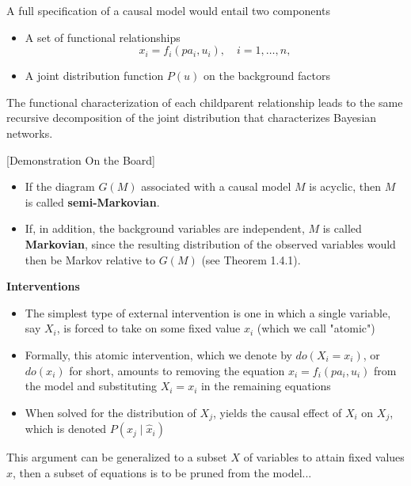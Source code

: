 \documentclass{beamer}
\begin{document}
\begin{frame}
A full specification of a causal model would entail two components
\begin{itemize}
\item A set of functional relationships
$$
x_i=f_i\left(p a_i, u_i\right), \quad i=1, \ldots, n,
$$
\item A joint distribution function $P(u)$ on the background factors
\end{itemize}

The functional characterization of each childparent relationship leads to the same recursive decomposition of the joint distribution that characterizes Bayesian networks.
\begin{center}
[Demonstration On the Board]
\end{center}

\vspace{0.2cm}
\begin{itemize}
\item If the diagram $G(M)$ associated with a causal model $M$ is acyclic, then $M$ is called \textbf{semi-Markovian}.
\item If, in addition, the background variables are independent, $M$ is called \textbf{Markovian}, since the resulting distribution of the observed variables would then be Markov relative to $G(M)$ (see Theorem 1.4.1).
\end{itemize}
\end{frame}

\begin{frame}
\textbf{Interventions}
\vspace{0.2cm}
\begin{itemize}
\item The simplest type of external intervention is one in which a single variable, say $X_i$, is forced to take on some fixed value $x_i$ (which we call "atomic")
\item Formally, this atomic intervention, which we denote by $do\left(X_i=x_i\right)$, or $do\left(x_i\right)$ for short, amounts to removing the equation $x_i=f_i\left(p a_i, u_i\right)$ from the model and substituting $X_i=x_i$ in the remaining equations
\item When solved for the distribution of $X_j$, yields the causal effect of $X_i$ on $X_j$, which is denoted $P\left(x_j \mid \hat{x}_i\right)$
\end{itemize}

This argument can be generalized to a subset $X$ of variables to attain fixed values $x$, then a subset of equations is to be pruned from the model...
\end{frame}
\end{document}
